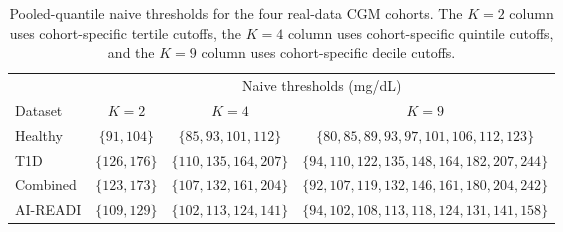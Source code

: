 \begin{table}[t]
\centering
\caption{Pooled-quantile naive thresholds for the four real-data CGM cohorts. The $K=2$ column uses cohort-specific tertile cutoffs, the $K=4$ column uses cohort-specific quintile cutoffs, and the $K=9$ column uses cohort-specific decile cutoffs.}
\label{tab:real_naive_thresholds}
\small
\begin{tabular}{lccc}
\toprule
 & \multicolumn{3}{c}{Naive thresholds (mg/dL)} \\
\cmidrule(lr){2-4}
Dataset & $K=2$ & $K=4$ & $K=9$ \\
\midrule
Healthy & $\{91, 104\}$ & $\{85, 93, 101, 112\}$ & $\{80, 85, 89, 93, 97, 101, 106, 112, 123\}$ \\
T1D & $\{126, 176\}$ & $\{110, 135, 164, 207\}$ & $\{94, 110, 122, 135, 148, 164, 182, 207, 244\}$ \\
Combined & $\{123, 173\}$ & $\{107, 132, 161, 204\}$ & $\{92, 107, 119, 132, 146, 161, 180, 204, 242\}$ \\
AI-READI & $\{109, 129\}$ & $\{102, 113, 124, 141\}$ & $\{94, 102, 108, 113, 118, 124, 131, 141, 158\}$ \\
\bottomrule
\end{tabular}
\end{table}